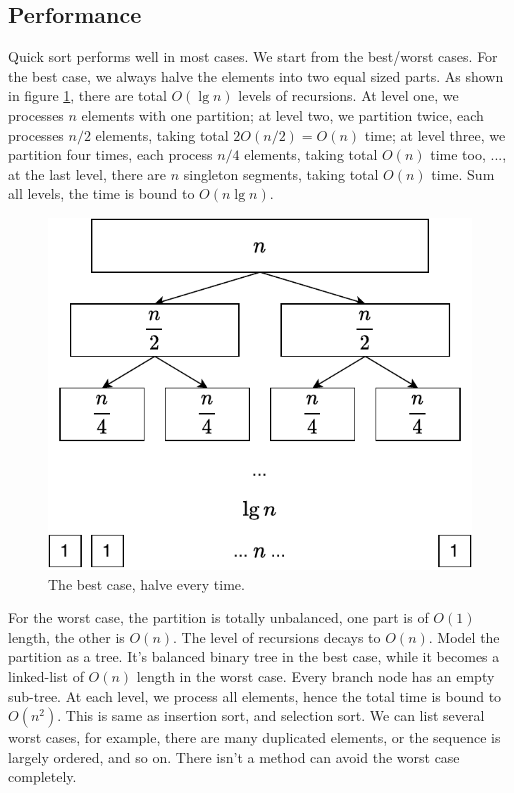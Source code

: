 \documentclass[b5paper]{article}
\begin{document}
\subsection{Performance}
 \label{sec:quick-sort-big-o}

Quick sort performs well in most cases. We start from the best/worst cases. For the best case, we always halve the elements into two equal sized parts. As shown in figure \cref{fig:qsort-best}, there are total $O(\lg n)$ levels of recursions. At level one, we processes $n$ elements with one partition; at level two, we partition twice, each processes $n/2$ elements, taking total $2 O(n/2) = O(n)$ time; at level three, we partition four times, each process $n/4$ elements, taking total $O(n)$ time too, ..., at the last level, there are $n$ singleton segments, taking total $O(n)$ time. Sum all levels, the time is bound to $O(n \lg n)$.

\begin{figure}[htbp]
 \centering
 \includegraphics[scale=0.55]{img/qsort-best}
 \caption{The best case, halve every time.}
 \label{fig:qsort-best}
\end{figure}

For the worst case, the partition is totally unbalanced, one part is of $O(1)$ length, the other is $O(n)$. The level of recursions decays to $O(n)$. Model the partition as a tree. It's balanced binary tree in the best case, while it becomes a linked-list of $O(n)$ length in the worst case. Every branch node has an empty sub-tree. At each level, we process all elements, hence the total time is bound to $O(n^2)$. This is same as insertion sort, and selection sort. We can list several worst cases, for example, there are many duplicated elements, or the sequence is largely ordered, and so on. There isn't a method can avoid the worst case completely.
\end{document}
